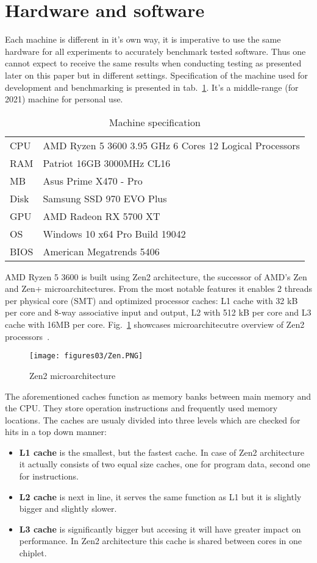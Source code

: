 \clearpage
\section{Hardware and software} 
Each machine is different in it's own way, it is imperative to use the same hardware for all experiments to accurately benchmark tested software. Thus one cannot expect to receive the same results when conducting testing as presented later on this paper but in different settings. Specification of the machine used for development and benchmarking is presented in tab.~\ref{tab:HardSpec}. It's a middle-range (for 2021) machine for personal use.
\begin{table}[!ht]
    \centering
    \caption{Machine specification}
		\label{tab:HardSpec}
    \begin{tabular}{ll}
			\toprule
			CPU  & AMD Ryzen 5 3600 3.95 GHz 6 Cores 12 Logical Processors \\
			RAM  & Patriot 16GB 3000MHz CL16 \\ 
			MB   & Asus Prime X470 - Pro \\ 
			Disk & Samsung SSD 970 EVO Plus \\
			GPU  & AMD Radeon RX 5700 XT \\ 
			OS   & Windows 10 x64 Pro Build 19042 \\ 
			BIOS & American Megatrends 5406 \\ 
			\bottomrule
    \end{tabular}
\end{table}

AMD Ryzen 5 3600 is built using Zen2 architecture,  the successor of AMD's Zen and Zen+ microarchitectures. From the most notable features it enables 2 threads per physical core (SMT) and optimized processor caches: L1 cache with 32 kB  per core and 8-way associative input and output, L2 with 512 kB per core and L3 cache with 16MB per core. Fig.~\ref{fig:Zen} showcases microarchitecutre overview of Zen2 processors~\cite{Zen}.

\begin{figure}[!ht]
	\centering
		\texttt{[image: figures03/Zen.PNG]}
	\caption{Zen2 microarchitecture}
	\label{fig:Zen}
\end{figure}

The aforementioned caches function as memory banks between main memory and the CPU. They store operation instructions and frequently used memory locations. The caches are usualy divided into three levels which are checked for hits in a top down manner:
\begin{itemize}
	\item \textbf{L1 cache} is the smallest, but the fastest cache. In case of Zen2 architecture it actually consists of two equal size caches, one for program data, second one for instructions. 
	\item \textbf{L2 cache} is next in line, it serves the same function as L1 but it is slightly bigger and slightly  slower.
	\item \textbf{L3 cache} is significantly bigger but accesing it will have  greater impact on performance. In Zen2 architecture this cache is shared between cores in one chiplet.  
\end{itemize}

